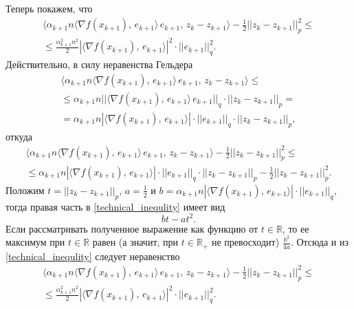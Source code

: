\documentclass[11pt]{article}
\newcommand{\RR}{\mathbb{R}}
\begin{document}
		Теперь покажем, что
		\begin{equation*}
			\begin{array}{rl}
				\langle \alpha_{k+1}n \langle \nabla f(x_{k+1}), \, e_{k+1}\rangle \, e_{k+1}, \, z_{k}-z_{k+1}\rangle - \frac{1}{2}||z_k-z_{k+1}||_p^2\leqslant\\
				\leqslant \frac{\alpha_{k+1}^2n^2}{2} |\langle \nabla f(x_{k+1}), \, e_{k+1}\rangle|^2 \cdot ||e_{k+1}||_q^2.
			\end{array}
		\end{equation*}
		Действительно, в силу неравенства Гельдера
		\begin{equation*}
			\begin{array}{rl}
				\langle \alpha_{k+1}n \langle \nabla f(x_{k+1}), \, e_{k+1}\rangle \, e_{k+1}, \, z_{k}-z_{k+1}\rangle\leqslant\\
				\leqslant \alpha_{k+1}n ||\langle \nabla f(x_{k+1}), \, e_{k+1}\rangle \, e_{k+1}||_q\cdot||z_{k}-z_{k+1}||_p=\\
				= \alpha_{k+1}n|\langle \nabla f(x_{k+1}), \, e_{k+1}\rangle|\cdot||e_{k+1}||_q\cdot||z_{k}-z_{k+1}||_p,
			\end{array}
		\end{equation*}
		откуда
		\begin{equation}\label{technical_inequlity}
			\begin{array}{rl}
				\langle \alpha_{k+1} n \langle \nabla f(x_{k+1}), \, e_{k+1}\rangle \, e_{k+1}, \, z_{k}-z_{k+1}\rangle - \frac{1}{2}||z_k-z_{k+1}||_p^2\leqslant\\
				\leqslant \alpha_{k+1}n|\langle \nabla f(x_{k+1}), \, e_{k+1}\rangle|\cdot||e_{k+1}||_q\cdot||z_{k}-z_{k+1}||_p - \frac{1}{2}||z_k-z_{k+1}||_p^2.
			\end{array}
		\end{equation}
		Положим $t = ||z_k-z_{k+1}||_p$, $a = \frac{1}{2}$ и $b = \alpha_{k+1}n|\langle \nabla f(x_{k+1}), \, e_{k+1}\rangle|\cdot||e_{k+1}||_q$, тогда правая часть в \eqref{technical_inequlity} имеет вид
		$$
		bt-at^2.
		$$
		Если рассматривать полученное выражение как функцию от $t\in\RR$, то ее максимум при $t\in\RR$ равен (а значит, при $t\in\RR_+$ не превосходит) $\frac{b^2}{4a}$. Отсюда и из \eqref{technical_inequlity} следует неравенство
		\begin{equation}\label{lem2:golder}
			\begin{array}{rl}
				\langle \alpha_{k+1}n \langle \nabla f(x_{k+1}), \, e_{k+1}\rangle \, e_{k+1}, \, z_{k}-z_{k+1}\rangle - \frac{1}{2}||z_k-z_{k+1}||_p^2 \leqslant\\
				\leqslant \frac{\alpha_{k+1}^2n^2}{2} |\langle \nabla f(x_{k+1}), \, e_{k+1}\rangle|^2 \cdot ||e_{k+1}||_q^2.
			\end{array}
		\end{equation}
		
\end{document}
